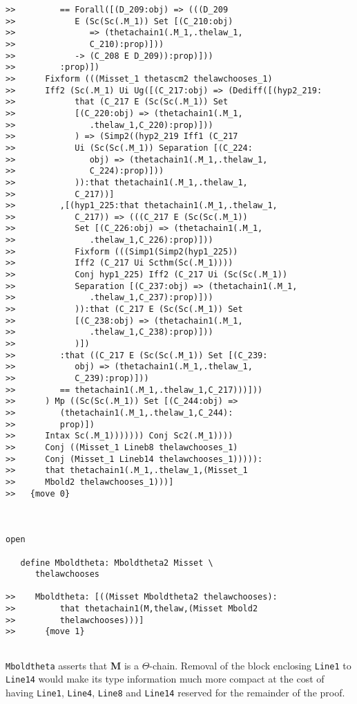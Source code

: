 \documentclass[12pt]{article}
\begin{document}
\begin{verbatim}
>>         == Forall([(D_209:obj) => (((D_209
>>            E (Sc(Sc(.M_1)) Set [(C_210:obj)
>>               => (thetachain1(.M_1,.thelaw_1,
>>               C_210):prop)]))
>>            -> (C_208 E D_209)):prop)]))
>>         :prop)])
>>      Fixform (((Misset_1 thetascm2 thelawchooses_1)
>>      Iff2 (Sc(.M_1) Ui Ug([(C_217:obj) => (Dediff([(hyp2_219:
>>            that (C_217 E (Sc(Sc(.M_1)) Set
>>            [(C_220:obj) => (thetachain1(.M_1,
>>               .thelaw_1,C_220):prop)]))
>>            ) => (Simp2((hyp2_219 Iff1 (C_217
>>            Ui (Sc(Sc(.M_1)) Separation [(C_224:
>>               obj) => (thetachain1(.M_1,.thelaw_1,
>>               C_224):prop)]))
>>            )):that thetachain1(.M_1,.thelaw_1,
>>            C_217))]
>>         ,[(hyp1_225:that thetachain1(.M_1,.thelaw_1,
>>            C_217)) => (((C_217 E (Sc(Sc(.M_1))
>>            Set [(C_226:obj) => (thetachain1(.M_1,
>>               .thelaw_1,C_226):prop)]))
>>            Fixform (((Simp1(Simp2(hyp1_225))
>>            Iff2 (C_217 Ui Scthm(Sc(.M_1))))
>>            Conj hyp1_225) Iff2 (C_217 Ui (Sc(Sc(.M_1))
>>            Separation [(C_237:obj) => (thetachain1(.M_1,
>>               .thelaw_1,C_237):prop)]))
>>            )):that (C_217 E (Sc(Sc(.M_1)) Set
>>            [(C_238:obj) => (thetachain1(.M_1,
>>               .thelaw_1,C_238):prop)]))
>>            )])
>>         :that ((C_217 E (Sc(Sc(.M_1)) Set [(C_239:
>>            obj) => (thetachain1(.M_1,.thelaw_1,
>>            C_239):prop)]))
>>         == thetachain1(.M_1,.thelaw_1,C_217)))]))
>>      ) Mp ((Sc(Sc(.M_1)) Set [(C_244:obj) =>
>>         (thetachain1(.M_1,.thelaw_1,C_244):
>>         prop)])
>>      Intax Sc(.M_1))))))) Conj Sc2(.M_1))))
>>      Conj ((Misset_1 Lineb8 thelawchooses_1)
>>      Conj (Misset_1 Lineb14 thelawchooses_1))))):
>>      that thetachain1(.M_1,.thelaw_1,(Misset_1
>>      Mbold2 thelawchooses_1)))]
>>   {move 0}



open

   define Mboldtheta: Mboldtheta2 Misset \
      thelawchooses

>>    Mboldtheta: [((Misset Mboldtheta2 thelawchooses):
>>         that thetachain1(M,thelaw,(Misset Mbold2
>>         thelawchooses)))]
>>      {move 1}


\end{verbatim}

{\tt Mboldtheta} asserts that {\bf M} is a $\Theta$-chain.  Removal of the block enclosing {\tt Line1} to {\tt Line14} would make its type information much more compact at the  cost
of having {\tt Line1}, {\tt Line4}, {\tt Line8} and {\tt Line14} reserved for the remainder of the proof.
\end{document}

